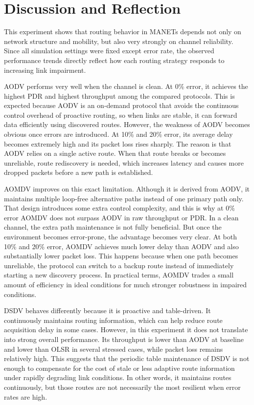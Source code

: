 \documentclass[11pt]{article}
\begin{document}
\section{Discussion and Reflection}

This experiment shows that routing behavior in MANETs depends not only on network structure and mobility, but also very strongly on channel reliability. Since all simulation settings were fixed except error rate, the observed performance trends directly reflect how each routing strategy responds to increasing link impairment.

AODV performs very well when the channel is clean. At 0\% error, it achieves the highest PDR and highest throughput among the compared protocols. This is expected because AODV is an on-demand protocol that avoids the continuous control overhead of proactive routing, so when links are stable, it can forward data efficiently using discovered routes. However, the weakness of AODV becomes obvious once errors are introduced. At 10\% and 20\% error, its average delay becomes extremely high and its packet loss rises sharply. The reason is that AODV relies on a single active route. When that route breaks or becomes unreliable, route rediscovery is needed, which increases latency and causes more dropped packets before a new path is established.

AOMDV improves on this exact limitation. Although it is derived from AODV, it maintains multiple loop-free alternative paths instead of one primary path only. That design introduces some extra control complexity, and this is why at 0\% error AOMDV does not surpass AODV in raw throughput or PDR. In a clean channel, the extra path maintenance is not fully beneficial. But once the environment becomes error-prone, the advantage becomes very clear. At both 10\% and 20\% error, AOMDV achieves much lower delay than AODV and also substantially lower packet loss. This happens because when one path becomes unreliable, the protocol can switch to a backup route instead of immediately starting a new discovery process. In practical terms, AOMDV trades a small amount of efficiency in ideal conditions for much stronger robustness in impaired conditions.

DSDV behaves differently because it is proactive and table-driven. It continuously maintains routing information, which can help reduce route acquisition delay in some cases. However, in this experiment it does not translate into strong overall performance. Its throughput is lower than AODV at baseline and lower than OLSR in several stressed cases, while packet loss remains relatively high. This suggests that the periodic table maintenance of DSDV is not enough to compensate for the cost of stale or less adaptive route information under rapidly degrading link conditions. In other words, it maintains routes continuously, but those routes are not necessarily the most resilient when error rates are high.
\end{document}
